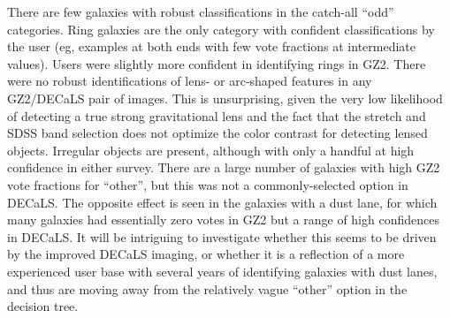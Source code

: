 \documentclass[iop,apj,tighten]{emulateapj}
\begin{document}
There are few galaxies with robust classifications in the catch-all ``odd'' categories. Ring galaxies are the only category with confident classifications by the user (eg, examples at both ends with few vote fractions at intermediate values). Users were slightly more confident in identifying rings in GZ2. There were no robust identifications of lens- or arc-shaped features in any GZ2/DECaLS pair of images. This is unsurprising, given the very low likelihood of detecting a true strong gravitational lens \citep[$\sim2\times10^{-4}$;][]{mar16} and the fact that the stretch and SDSS band selection does not optimize the color contrast for detecting lensed objects. Irregular objects are present, although with only a handful at high confidence in either survey. There are a large number of galaxies with high GZ2 vote fractions for ``other'', but this was not a commonly-selected option in DECaLS. The opposite effect is seen in the galaxies with a dust lane, for which many galaxies had essentially zero votes in GZ2 but a range of high confidences in DECaLS. It will be intriguing to investigate whether this seems to be driven by the improved DECaLS imaging, or whether it is a reflection of a more experienced user base with several years of identifying galaxies with dust lanes, and thus are moving away from the relatively vague ``other'' option in the decision tree.

\acknowledgments{
}



\end{document}
